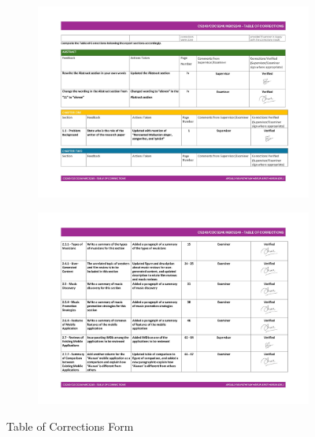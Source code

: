 \clearpage
\begin{figure}[h]
    \centering
    \begin{subfigure}[b]{0.9\textwidth}
        \centering
        \includegraphics[width=\textwidth]{appendices/forms/toc3.jpg}
        \label{fig:sub1}
    \end{subfigure}
    \hspace{0.03\textwidth}
    \begin{subfigure}[b]{0.9\textwidth}
        \centering
        \includegraphics[width=\textwidth]{appendices/forms/toc4.jpg}
        \label{fig:sub2}
    \end{subfigure}
    \caption{Table of Corrections Form}
    \label{fig:myfig91}
\end{figure}
\clearpage
